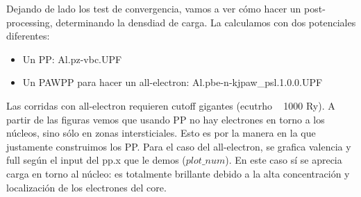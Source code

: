   Dejando de lado los test de convergencia, vamos a ver cómo hacer un post-processing, determinando la densdiad de carga. La calculamos con dos potenciales diferentes:
    \begin{itemize}
      \item Un PP: Al.pz-vbc.UPF
      \item Un PAWPP para hacer un all-electron: Al.pbe-n-kjpaw\_psl.1.0.0.UPF
    \end{itemize}

  Las corridas con all-electron requieren cutoff gigantes (ecutrho ~ 1000 Ry). A partir de las figuras vemos que usando PP no hay electrones en torno a los núcleos, sino sólo en zonas intersticiales. Esto es por la manera en la que justamente construimos los PP. Para el caso del all-electron, se grafica valencia y full según el input del pp.x que le demos ($plot\_num$). En este caso sí se aprecia carga en torno al núcleo: es totalmente brillante debido a la alta concentración y localización de los electrones del core.

